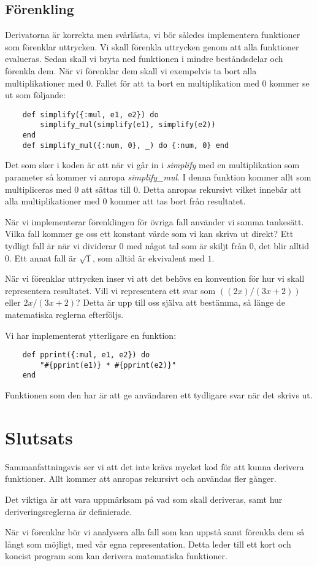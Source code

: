 \documentclass[a4paper,11pt]{article}
\begin{document}
\subsection*{Förenkling}
Derivatorna är korrekta men svårlästa, vi bör således implementera funktioner som förenklar uttrycken. Vi skall förenkla uttrycken genom att alla funktioner evalueras. Sedan skall vi bryta ned funktionen i mindre beståndsdelar och förenkla dem. När vi förenklar dem skall vi exempelvis ta bort alla multiplikationer med \(0\). Fallet för att ta bort en multiplikation med \(0\) kommer se ut som följande:
\begin{verbatim}
    def simplify({:mul, e1, e2}) do
        simplify_mul(simplify(e1), simplify(e2)) 
    end
    def simplify_mul({:num, 0}, _) do {:num, 0} end
\end{verbatim}
Det som sker i koden är att när vi går in i \textit{simplify} med en multiplikation som parameter så kommer vi anropa \textit{simplify\_mul}. I denna funktion kommer allt som multipliceras med \(0\) att sättas till \(0\). Detta anropas rekursivt vilket innebär att alla multiplikationer med \(0\) kommer att tas bort från resultatet.

När vi implementerar förenklingen för övriga fall använder vi samma tankesätt. Vilka fall kommer ge oss ett konstant värde som vi kan skriva ut direkt? Ett tydligt fall är när vi dividerar \(0\) med något tal som är skiljt från \(0\), det blir alltid \(0\). Ett annat fall är \(\sqrt1\), som alltid är ekvivalent med \(1\). 

När vi förenklar uttrycken inser vi att det behövs en konvention för hur vi skall representera resultatet. Vill vi representera ett svar som \(((2x)/(3x+2))\) eller \(2x/(3x+2)\)? Detta är upp till oss själva att bestämma, så länge de matematiska reglerna efterföljs.

Vi har implementerat ytterligare en funktion:
\begin{verbatim}
    def pprint({:mul, e1, e2}) do
        "#{pprint(e1)} * #{pprint(e2)}" 
    end
\end{verbatim}
Funktionen som den har är att ge användaren ett tydligare svar när det skrivs ut. 
\section*{Slutsats}
Sammanfattningsvis ser vi att det inte krävs mycket kod för att kunna derivera funktioner. Allt kommer att anropas rekursivt och användas fler gånger. 

Det viktiga är att vara uppmärksam på vad som skall deriveras, samt hur deriveringsreglerna är definierade. 

När vi förenklar bör vi analysera alla fall som kan uppstå samt förenkla dem så långt som möjligt, med vår egna representation. Detta leder till ett kort och koncist program som kan derivera matematiska funktioner.
\end{document}
